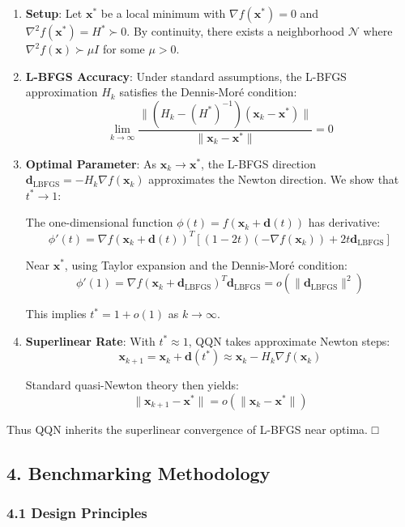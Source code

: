 \begin{enumerate}
\def\labelenumi{\arabic{enumi}.}
\item
  \textbf{Setup}: Let \(\mathbf{x}^*\) be a local minimum with \(\nabla f(\mathbf{x}^*) = 0\) and \(\nabla^2 f(\mathbf{x}^*) = H^* \succ 0\). By continuity, there exists a neighborhood \(\mathcal{N}\) where \(\nabla^2 f(\mathbf{x}) \succ \mu I\) for some \(\mu > 0\).
\item
  \textbf{L-BFGS Accuracy}: Under standard assumptions, the L-BFGS approximation \(H_k\) satisfies the Dennis-Moré condition:
  \[\lim_{k \to \infty} \frac{\|(H_k - (H^*)^{-1})(\mathbf{x}_k - \mathbf{x}^*)\|}{\|\mathbf{x}_k - \mathbf{x}^*\|} = 0\]
\item
  \textbf{Optimal Parameter}: As \(\mathbf{x}_k \to \mathbf{x}^*\), the L-BFGS direction \(\mathbf{d}_{\text{LBFGS}} = -H_k \nabla f(\mathbf{x}_k)\) approximates the Newton direction. We show that \(t^* \to 1\):

  The one-dimensional function \(\phi(t) = f(\mathbf{x}_k + \mathbf{d}(t))\) has derivative:
  \[\phi'(t) = \nabla f(\mathbf{x}_k + \mathbf{d}(t))^T[(1-2t)(-\nabla f(\mathbf{x}_k)) + 2t\mathbf{d}_{\text{LBFGS}}]\]

  Near \(\mathbf{x}^*\), using Taylor expansion and the Dennis-Moré condition:
  \[\phi'(1) = \nabla f(\mathbf{x}_k + \mathbf{d}_{\text{LBFGS}})^T \mathbf{d}_{\text{LBFGS}} = o(\|\mathbf{d}_{\text{LBFGS}}\|^2)\]

  This implies \(t^* = 1 + o(1)\) as \(k \to \infty\).
\item
  \textbf{Superlinear Rate}: With \(t^* \approx 1\), QQN takes approximate Newton steps:
  \[\mathbf{x}_{k+1} = \mathbf{x}_k + \mathbf{d}(t^*) \approx \mathbf{x}_k - H_k \nabla f(\mathbf{x}_k)\]

  Standard quasi-Newton theory then yields:
  \[\|\mathbf{x}_{k+1} - \mathbf{x}^*\| = o(\|\mathbf{x}_k - \mathbf{x}^*\|)\]
\end{enumerate}

Thus QQN inherits the superlinear convergence of L-BFGS near optima. □

\hypertarget{benchmarking-methodology}{%
\subsection{4. Benchmarking Methodology}\label{benchmarking-methodology}}

\hypertarget{design-principles}{%
\subsubsection{4.1 Design Principles}\label{design-principles}}

